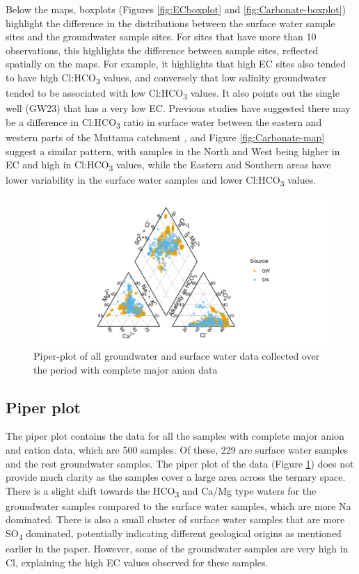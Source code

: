 \documentclass[, manuscript]{copernicus}
\begin{document}
Below the maps, boxplots (Figures \ref{fig:ECboxplot} and
\ref{fig:Carbonate-boxplot}) highlight the difference in the
distributions between the surface water sample sites and the groundwater
sample sites. For sites that have more than 10 observations, this
highlights the difference between sample sites, reflected spatially on
the maps. For example, it highlights that high EC sites also tended to
have high Cl:HCO\textsubscript{3} values, and conversely that low
salinity groundwater tended to be associated with low
Cl:HCO\textsubscript{3} values. It also points out the single well
(GW23) that has a very low EC. Previous studies have suggested there may
be a difference in Cl:HCO\textsubscript{3} ratio in surface water
between the eastern and western parts of the Muttama catchment
\citep{Conyers2008}, and Figure \ref{fig:Carbonate-map} suggest a
similar pattern, with samples in the North and West being higher in EC
and high in Cl:HCO\textsubscript{3} values, while the Eastern and
Southern areas have lower variability in the surface water samples and
lower Cl:HCO\textsubscript{3} values.

\begin{figure}
\includegraphics[width=0.8\linewidth]{Figures/piper_plot} \caption{Piper-plot of all groundwater and surface water data collected over the period with complete major anion data}\label{fig:piperplot}
\end{figure}

\subsection{Piper plot}

The piper plot contains the data for all the samples with complete major
anion and cation data, which are 500 samples. Of these, 229 are surface
water samples and the rest groundwater samples. The piper plot of the
data (Figure \ref{fig:piperplot}) does not provide much clarity as the
samples cover a large area across the ternary space. There is a slight
shift towards the HCO\textsubscript{3} and Ca/Mg type waters for the
groundwater samples compared to the surface water samples, which are
more Na dominated. There is also a small cluster of surface water
samples that are more SO\textsubscript{4} dominated, potentially
indicating different geological origins as mentioned earlier in the
paper. However, some of the groundwater samples are very high in Cl,
explaining the high EC values observed for these samples.
\end{document}
